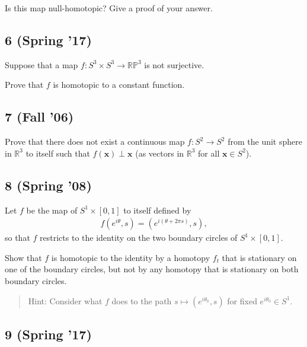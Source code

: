 Is this map null-homotopic? Give a proof of your answer.

\hypertarget{spring-17-4}{%
\subsection{6 (Spring '17)}\label{spring-17-4}}

Suppose that a map \(f : S^3 \times S^3 \to {\mathbb{RP}}^3\) is not
surjective.

Prove that \(f\) is homotopic to a constant function.


\hypertarget{fall-06-2}{%
\subsection{7 (Fall '06)}\label{fall-06-2}}

Prove that there does not exist a continuous map \(f : S^2 \to S^2\)
from the unit sphere in \({\mathbb{R}}^3\) to itself such that
\(f (\mathbf{x}) \perp \mathbf{x}\) (as vectors in \({\mathbb{R}}^3\)
for all \(\mathbf{x} \in S^2\)).

\hypertarget{spring-08-5}{%
\subsection{8 (Spring '08)}\label{spring-08-5}}

Let \(f\) be the map of \(S^1 \times [0, 1]\) to itself defined by
\begin{align*}
f (e^{i\theta} , s) = (e^{i(\theta+2\pi s)} , s)
,\end{align*}
so that \(f\) restricts to the identity on the two boundary circles of
\(S^1 \times [0, 1]\).

Show that \(f\) is homotopic to the identity by a homotopy \(f_t\) that
is stationary on one of the boundary circles, but not by any homotopy
that is stationary on both boundary circles.

\begin{quote}
Hint: Consider what \(f\) does to the path
\(s \mapsto (e^{i\theta_0} , s)\) for fixed \(e^{i\theta_0} \in S^1\).
\end{quote}

\hypertarget{spring-17-5}{%
\subsection{9 (Spring '17)}\label{spring-17-5}}

